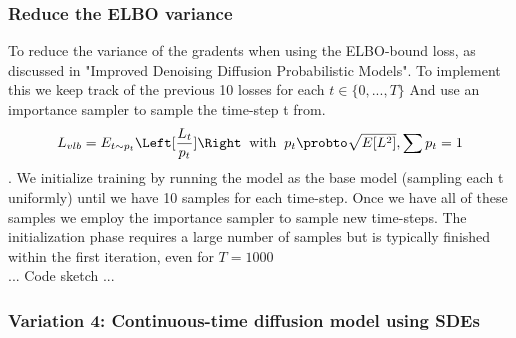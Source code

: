 \subsubsection{Reduce the ELBO variance}

To reduce the variance of the gradents when using the ELBO-bound loss, as discussed in "Improved Denoising Diffusion Probabilistic Models". 
To implement this we keep track of the previous 10 losses for each $t \in \{0,...,T\}$ And use an importance sampler to sample the time-step t from.
$$L_{vlb}= E_{t\sim p_t} \Left[\frac{L_t}{p_t}]\Right \;\; \text{with} \;\; p_t \probto \sqrt{E[L^2]}, \sum p_t = 1 $$.
We initialize training by running the model as the base model (sampling each t uniformly) until we have 10 samples for each time-step.
Once we have all of these samples we employ the importance sampler to sample new time-steps.
The initialization phase requires a large number of samples but is typically finished within the first iteration, even for $T=1000$
\\
... Code sketch ...
\\\subsubsection{Variation 4: Continuous-time diffusion model using SDEs}

